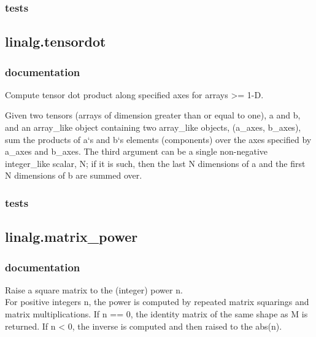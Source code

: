 \documentclass[a4paper,11pt]{article}
\begin{document}
\subsubsection{tests}
\subsection{linalg.tensordot}
\subsubsection{documentation}
Compute tensor dot product along specified axes for arrays >= 1-D.

Given two tensors (arrays of dimension greater than or equal to one), a and b, and an array\_like object containing two array\_like objects, (a\_axes, b\_axes), sum the products of a‘s and b‘s elements (components) over the axes specified by a\_axes and b\_axes. The third argument can be a single non-negative integer\_like scalar, N; if it is such, then the last N dimensions of a and the first N dimensions of b are summed over.

\subsubsection{tests}


\subsection{linalg.matrix\_power}
\subsubsection{documentation}
Raise a square matrix to the (integer) power n.\\

For positive integers n, the power is computed by repeated matrix squarings and matrix multiplications. If n == 0, the identity matrix of the same shape as M is returned. If n < 0, the inverse is computed and then raised to the abs(n).
\end{document}
